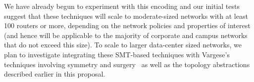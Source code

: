 We have already begun to experiment with this encoding and our initial tests suggest
that these techniques will scale to moderate-sized networks with at least 100 routers or
more, depending on the network policies and properties of interest
(and hence will be applicable to the majority of corporate and campus networks 
that do not exceed this size).  To scale to larger data-center sized networks,
we plan to investigate integrating these SMT-based techniques with
Vargese's techniques involving symmetry and surgery~\cite{bjorner+:scaling-network-verification} as well as the topology
abstractions described earlier in this proposal.





